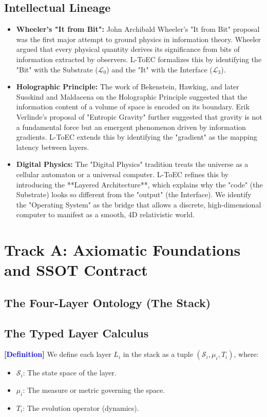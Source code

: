 \documentclass[11pt,titlepage]{article}
\newcommand{\substrate}{\mathcal{L}_0}
\newcommand{\interface}{\mathcal{L}_3}
\newcommand{\tagdef}{\textcolor{blue}{\textbf{[Definition]}} }
\begin{document}
\subsection{Intellectual Lineage}
\begin{itemize}
    
\item \textbf{Wheeler's "It from Bit":} John Archibald Wheeler's "It from Bit" proposal was the first major attempt to ground physics in information theory. Wheeler argued that every physical quantity derives its significance from bits of information extracted by observers. L-ToEC formalizes this by identifying the "Bit" with the Substrate ($\substrate$) and the "It" with the Interface ($\interface$).
    
\item \textbf{Holographic Principle:} The work of Bekenstein, Hawking, and later Susskind and Maldacena on the Holographic Principle suggested that the information content of a volume of space is encoded on its boundary. Erik Verlinde's proposal of "Entropic Gravity" further suggested that gravity is not a fundamental force but an emergent phenomenon driven by information gradients. L-ToEC extends this by identifying the "gradient" as the mapping latency between layers.
    
\item \textbf{Digital Physics:} The "Digital Physics" tradition treats the universe as a cellular automaton or a universal computer. L-ToEC refines this by introducing the **Layered Architecture**, which explains why the "code" (the Substrate) looks so different from the "output" (the Interface). We identify the "Operating System" as the bridge that allows a discrete, high-dimensional computer to manifest as a smooth, 4D relativistic world.
\end{itemize}

\section{Track A: Axiomatic Foundations and SSOT Contract}
\label{sec:axioms}


\subsection{The Four-Layer Ontology (The Stack)}

\subsection{The Typed Layer Calculus}
\tagdef We define each layer $L_i$ in the stack as a tuple $(\mathcal{S}_i, \mu_i, T_i)$, where:
\begin{itemize}
    
\item $\mathcal{S}_i$: The state space of the layer.
    
\item $\mu_i$: The measure or metric governing the space.
    
\item $T_i$: The evolution operator (dynamics).
\end{itemize}
\end{document}
